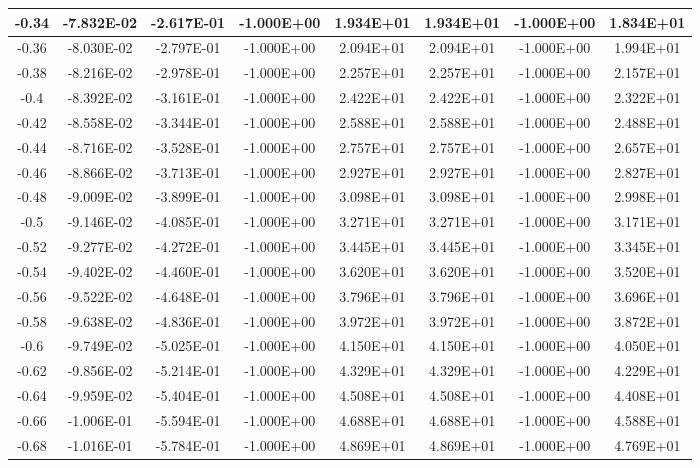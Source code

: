 \documentclass{article}
\begin{document}
\begin{center}
\begin{longtable}{|c|c|c|c|c|c|c|c|}
        -0.34 & -7.832E-02 & -2.617E-01 & -1.000E+00 & 1.934E+01 & 1.934E+01 & -1.000E+00 & 1.834E+01 \\ \hline
        -0.36 & -8.030E-02 & -2.797E-01 & -1.000E+00 & 2.094E+01 & 2.094E+01 & -1.000E+00 & 1.994E+01 \\ \hline
        -0.38 & -8.216E-02 & -2.978E-01 & -1.000E+00 & 2.257E+01 & 2.257E+01 & -1.000E+00 & 2.157E+01 \\ \hline
        -0.4 & -8.392E-02 & -3.161E-01 & -1.000E+00 & 2.422E+01 & 2.422E+01 & -1.000E+00 & 2.322E+01 \\ \hline
        -0.42 & -8.558E-02 & -3.344E-01 & -1.000E+00 & 2.588E+01 & 2.588E+01 & -1.000E+00 & 2.488E+01 \\ \hline
        -0.44 & -8.716E-02 & -3.528E-01 & -1.000E+00 & 2.757E+01 & 2.757E+01 & -1.000E+00 & 2.657E+01 \\ \hline
        -0.46 & -8.866E-02 & -3.713E-01 & -1.000E+00 & 2.927E+01 & 2.927E+01 & -1.000E+00 & 2.827E+01 \\ \hline
        -0.48 & -9.009E-02 & -3.899E-01 & -1.000E+00 & 3.098E+01 & 3.098E+01 & -1.000E+00 & 2.998E+01 \\ \hline
        -0.5 & -9.146E-02 & -4.085E-01 & -1.000E+00 & 3.271E+01 & 3.271E+01 & -1.000E+00 & 3.171E+01 \\ \hline
        -0.52 & -9.277E-02 & -4.272E-01 & -1.000E+00 & 3.445E+01 & 3.445E+01 & -1.000E+00 & 3.345E+01 \\ \hline
        -0.54 & -9.402E-02 & -4.460E-01 & -1.000E+00 & 3.620E+01 & 3.620E+01 & -1.000E+00 & 3.520E+01 \\ \hline
        -0.56 & -9.522E-02 & -4.648E-01 & -1.000E+00 & 3.796E+01 & 3.796E+01 & -1.000E+00 & 3.696E+01 \\ \hline
        -0.58 & -9.638E-02 & -4.836E-01 & -1.000E+00 & 3.972E+01 & 3.972E+01 & -1.000E+00 & 3.872E+01 \\ \hline
        -0.6 & -9.749E-02 & -5.025E-01 & -1.000E+00 & 4.150E+01 & 4.150E+01 & -1.000E+00 & 4.050E+01 \\ \hline
        -0.62 & -9.856E-02 & -5.214E-01 & -1.000E+00 & 4.329E+01 & 4.329E+01 & -1.000E+00 & 4.229E+01 \\ \hline
        -0.64 & -9.959E-02 & -5.404E-01 & -1.000E+00 & 4.508E+01 & 4.508E+01 & -1.000E+00 & 4.408E+01 \\ \hline
        -0.66 & -1.006E-01 & -5.594E-01 & -1.000E+00 & 4.688E+01 & 4.688E+01 & -1.000E+00 & 4.588E+01 \\ \hline
        -0.68 & -1.016E-01 & -5.784E-01 & -1.000E+00 & 4.869E+01 & 4.869E+01 & -1.000E+00 & 4.769E+01 \\ \hline

\end{longtable}
\end{center}
\end{document}
